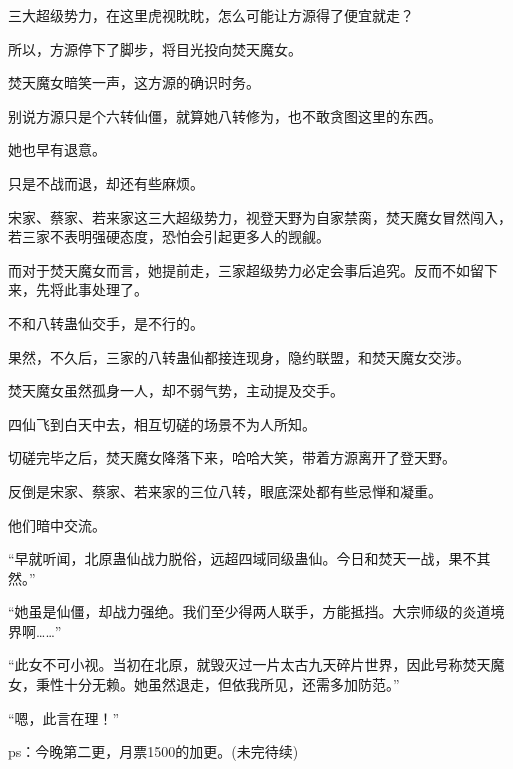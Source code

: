 \begin{this_body}
三大超级势力，在这里虎视眈眈，怎么可能让方源得了便宜就走？

所以，方源停下了脚步，将目光投向焚天魔女。

焚天魔女暗笑一声，这方源的确识时务。

别说方源只是个六转仙僵，就算她八转修为，也不敢贪图这里的东西。

她也早有退意。

只是不战而退，却还有些麻烦。

宋家、蔡家、若来家这三大超级势力，视登天野为自家禁脔，焚天魔女冒然闯入，若三家不表明强硬态度，恐怕会引起更多人的觊觎。

而对于焚天魔女而言，她提前走，三家超级势力必定会事后追究。反而不如留下来，先将此事处理了。

不和八转蛊仙交手，是不行的。

果然，不久后，三家的八转蛊仙都接连现身，隐约联盟，和焚天魔女交涉。

焚天魔女虽然孤身一人，却不弱气势，主动提及交手。

四仙飞到白天中去，相互切磋的场景不为人所知。

切磋完毕之后，焚天魔女降落下来，哈哈大笑，带着方源离开了登天野。

反倒是宋家、蔡家、若来家的三位八转，眼底深处都有些忌惮和凝重。

他们暗中交流。

“早就听闻，北原蛊仙战力脱俗，远超四域同级蛊仙。今日和焚天一战，果不其然。”

“她虽是仙僵，却战力强绝。我们至少得两人联手，方能抵挡。大宗师级的炎道境界啊……”

“此女不可小视。当初在北原，就毁灭过一片太古九天碎片世界，因此号称焚天魔女，秉性十分无赖。她虽然退走，但依我所见，还需多加防范。”

“嗯，此言在理！”

ps：今晚第二更，月票1500的加更。(未完待续)

\end{this_body}

